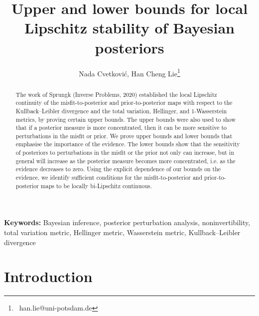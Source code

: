 \documentclass[a4paper]{scrartcl}
\theoremstyle{definition}
\numberwithin{equation}{section}
\begin{document}
\title{Upper and lower bounds for local Lipschitz stability of Bayesian posteriors}

\author{Nada Cvetkovi\'{c}, Han Cheng Lie\thanks{~han.lie@uni-potsdam.de}}
\renewcommand\Affilfont{\small}

\date{}

\maketitle

\begin{abstract}
 The work of Sprungk (Inverse Problems, 2020) established the local Lipschitz continuity of the misfit-to-posterior and prior-to-posterior maps with respect to the Kullback--Leibler divergence and the total variation, Hellinger, and 1-Wasserstein metrics, by proving certain upper bounds.
 The upper bounds were also used to show that if a posterior measure is more concentrated, then it can be more sensitive to perturbations in the misfit or prior.
 We prove upper bounds and lower bounds that emphasise the importance of the evidence.
 The lower bounds show that the sensitivity of posteriors to perturbations in the misfit or the prior not only can increase, but in general will increase as the posterior measure becomes more concentrated, i.e. as the evidence decreases to zero.
 Using the explicit dependence of our bounds on the evidence, we identify sufficient conditions for the misfit-to-posterior and prior-to-posterior maps to be locally bi-Lipschitz continuous.
\end{abstract}

\textbf{Keywords:} Bayesian inference, posterior perturbation analysis, noninvertibility, total variation metric, Hellinger metric, Wasserstein metric, Kullback--Leibler divergence

%

\section{Introduction}
\label{sec_introduction}
\end{document}
